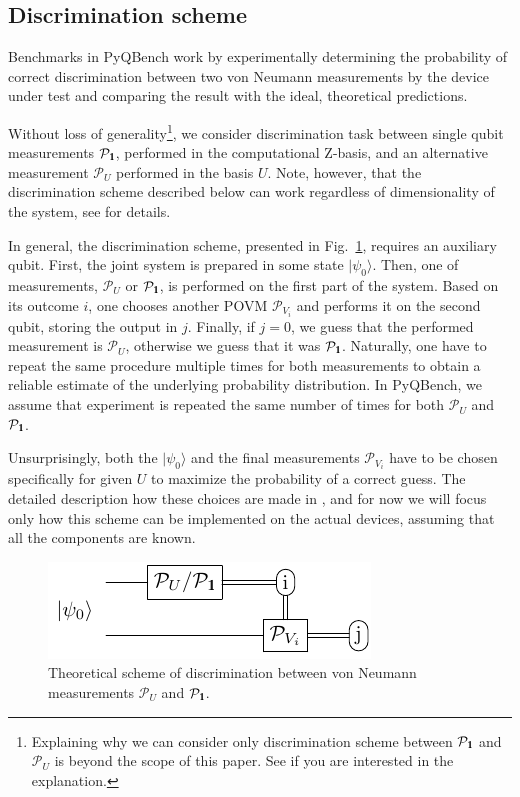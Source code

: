 \documentclass[preprint,12pt, a4paper, dvipsnames]{elsarticle}
\newcommand{\ket}[1]{\ensuremath{|#1\rangle}}
\newcommand{\1}{{\rm 1\hspace{-0.9mm}l}}
\newcommand{\Id}{{\rm 1\hspace{-0.9mm}l}}
\newcommand{\PP}{\mathcal{P}}
\theoremstyle{definition}
\begin{document}
\subsection{Discrimination scheme}\label{sec:discrimination-scheme}

Benchmarks in PyQBench work by experimentally determining the probability of correct discrimination
between two von Neumann measurements by the device under test and comparing the result with the
ideal, theoretical predictions.

Without loss of generality\footnote{Explaining why we can consider only discrimination scheme between $\PP_{\Id}$ and $\PP_{U}$ is beyond the scope of this paper. See \cite{puchala2018strategies} if you are
interested in the explanation.}, we consider discrimination task between single qubit measurements
$\PP_\Id$, performed in the computational Z-basis, and an alternative measurement $\PP_U$ performed
in the basis $U$. Note, however, that the discrimination scheme described below can work
regardless of dimensionality of the system, see \cite{puchala2018strategies} for details.

In general, the discrimination scheme, presented in Fig.~\ref{fig:theoretical_scheme}, requires an
auxiliary qubit. First, the joint system is prepared in some state $\ket{\psi_0}$. Then, one of
measurements,   $\PP_U$ or $\PP_\1$, is performed on the first part of the system. Based on its
outcome $i$, one chooses another POVM $\mathcal{P}_{V_i}$ and performs it on the second
qubit, storing the output in $j$. Finally, if $j=0$, we guess that the performed measurement is
$\mathcal{P}_U$, otherwise we guess that it was $\mathcal{P}_\Id$. Naturally, one have to repeat the
same procedure multiple times for both measurements to obtain a reliable estimate of the underlying
probability distribution. In PyQBench, we assume that experiment is repeated the same number of
times for both $\PP_U$ and $\PP_\Id$.

Unsurprisingly, both the
$\ket{\psi_0}$ and the final measurements $\mathcal{P}_{V_i}$ have to be chosen specifically for
given $U$ to maximize the probability of a correct guess. The detailed description  how these
choices are made in \cite{watrous}, and for now we will focus
only how this scheme can be implemented on the actual devices, assuming that all the components are known.

\begin{figure}[h!]
	\centering
	\includegraphics[scale=1.7]{pics/theoretical_scheme}
	\caption{Theoretical  scheme of discrimination  between von Neumann measurements $\PP_{U}$ and $\PP_\Id$. }
	\label{fig:theoretical_scheme}
\end{figure}
\end{document}
